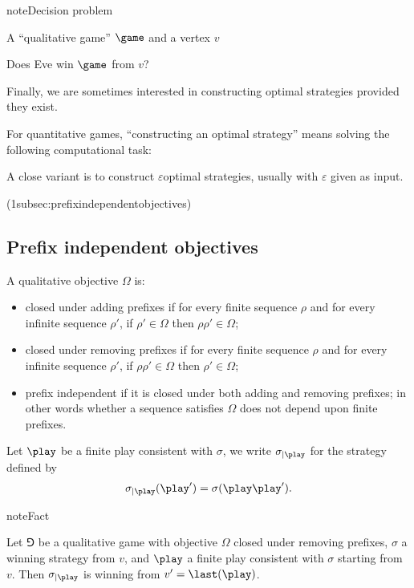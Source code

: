 \documentclass[letterpaper,10pt,english]{sphinxmanual}
\begin{document}
\begin{sphinxadmonition}{note}{Decision problem}

A “qualitative game” \(\game\) and a vertex \(v\)

Does Eve win \(\game\) from \(v\)?
\end{sphinxadmonition}

Finally, we are sometimes interested in constructing optimal strategies
provided they exist.

For quantitative games, “constructing an optimal strategy” means solving
the following computational task:

A close variant is to construct \(\varepsilon\)\sphinxhyphen{}optimal strategies,
usually with \(\varepsilon\) given as input.

(1\sphinxhyphen{}subsec:prefix\sphinxhyphen{}independent\sphinxhyphen{}objectives)


\subsection{Prefix independent objectives}
\label{\detokenize{1_Introduction/simple:prefix-independent-objectives}}
A qualitative objective \(\Omega\) is:
\begin{itemize}
\item {} 
closed under adding prefixes if for every finite sequence
\(\rho\) and for every infinite sequence \(\rho'\), if
\(\rho' \in \Omega\) then \(\rho \rho' \in \Omega\);

\item {} 
closed under removing prefixes if for every finite sequence
\(\rho\) and for every infinite sequence \(\rho'\), if
\(\rho \rho' \in \Omega\) then \(\rho' \in \Omega\);

\item {} 
prefix independent if it is closed under both adding and
removing prefixes; in other words whether a sequence satisfies
\(\Omega\) does not depend upon finite prefixes.

\end{itemize}

Let \(\play\) be a finite play consistent with \(\sigma\), we write
\(\sigma_{\mid \play}\) for the strategy defined by
\begin{equation*}
\begin{split}\sigma_{\mid \play}(\play') = \sigma(\play \play').\end{split}
\end{equation*}
\begin{sphinxadmonition}{note}{Fact}

Let \(\Game\) be a qualitative game with objective \(\Omega\) closed under removing prefixes,
\(\sigma\) a winning strategy from \(v\), and \(\play\) a finite play
consistent with \(\sigma\) starting from \(v\). Then \(\sigma_{\mid \play}\)
is winning from \(v' = \last(\play)\).
\end{sphinxadmonition}
\end{document}
